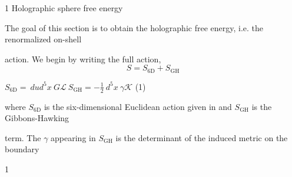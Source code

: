 \documentclass[a4paper,12pt]{article}
\begin{document}
1 Holographic sphere free energy

The goal of this section is to obtain the holographic free energy, i.e. the renormalized on-shell

action. We begin by writing the full action,
$$
S=S_{6\mathrm{D}}+S_{\mathrm{G}\mathrm{H}}
$$
\begin{center}
$S_{6\mathrm{D}}=\displaystyle \ dud^{5}x\ G\mathcal{L}\ S_{\mathrm{G}\mathrm{H}}=-\frac{1}{2}\ d^{5}x\ \gamma \mathcal{K}$   (1)
\end{center}
where $S_{6\mathrm{D}}$ is the six-dimensional Euclidean action given in and $S_{\mathrm{G}\mathrm{H}}$ is the Gibbons-Hawking

term. The $\gamma$ appearing in $S_{\mathrm{G}\mathrm{H}}$ is the determinant of the induced metric on the boundary

1
\end{document}
